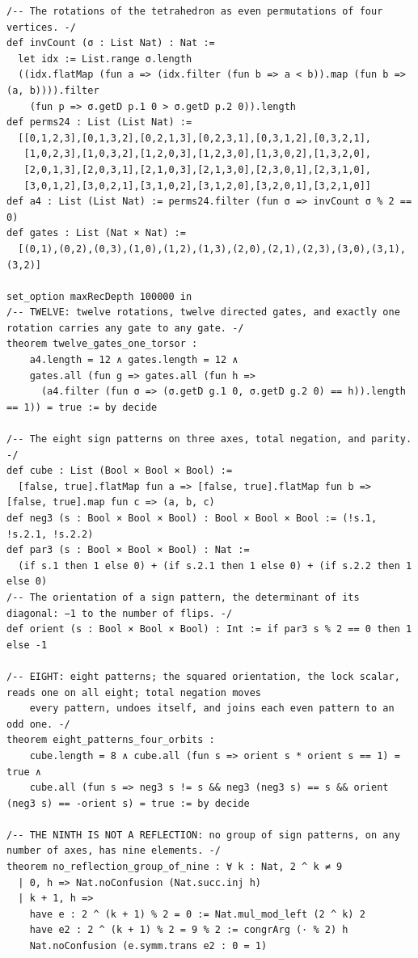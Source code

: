 \documentclass[10pt,twocolumn]{article}
\begin{document}
\begin{Verbatim}
/-- The rotations of the tetrahedron as even permutations of four vertices. -/
def invCount (σ : List Nat) : Nat :=
  let idx := List.range σ.length
  ((idx.flatMap (fun a => (idx.filter (fun b => a < b)).map (fun b => (a, b)))).filter
    (fun p => σ.getD p.1 0 > σ.getD p.2 0)).length
def perms24 : List (List Nat) :=
  [[0,1,2,3],[0,1,3,2],[0,2,1,3],[0,2,3,1],[0,3,1,2],[0,3,2,1],
   [1,0,2,3],[1,0,3,2],[1,2,0,3],[1,2,3,0],[1,3,0,2],[1,3,2,0],
   [2,0,1,3],[2,0,3,1],[2,1,0,3],[2,1,3,0],[2,3,0,1],[2,3,1,0],
   [3,0,1,2],[3,0,2,1],[3,1,0,2],[3,1,2,0],[3,2,0,1],[3,2,1,0]]
def a4 : List (List Nat) := perms24.filter (fun σ => invCount σ % 2 == 0)
def gates : List (Nat × Nat) :=
  [(0,1),(0,2),(0,3),(1,0),(1,2),(1,3),(2,0),(2,1),(2,3),(3,0),(3,1),(3,2)]

set_option maxRecDepth 100000 in
/-- TWELVE: twelve rotations, twelve directed gates, and exactly one rotation carries any gate to any gate. -/
theorem twelve_gates_one_torsor :
    a4.length = 12 ∧ gates.length = 12 ∧
    gates.all (fun g => gates.all (fun h =>
      (a4.filter (fun σ => (σ.getD g.1 0, σ.getD g.2 0) == h)).length == 1)) = true := by decide

/-- The eight sign patterns on three axes, total negation, and parity. -/
def cube : List (Bool × Bool × Bool) :=
  [false, true].flatMap fun a => [false, true].flatMap fun b => [false, true].map fun c => (a, b, c)
def neg3 (s : Bool × Bool × Bool) : Bool × Bool × Bool := (!s.1, !s.2.1, !s.2.2)
def par3 (s : Bool × Bool × Bool) : Nat :=
  (if s.1 then 1 else 0) + (if s.2.1 then 1 else 0) + (if s.2.2 then 1 else 0)
/-- The orientation of a sign pattern, the determinant of its diagonal: −1 to the number of flips. -/
def orient (s : Bool × Bool × Bool) : Int := if par3 s % 2 == 0 then 1 else -1

/-- EIGHT: eight patterns; the squared orientation, the lock scalar, reads one on all eight; total negation moves
    every pattern, undoes itself, and joins each even pattern to an odd one. -/
theorem eight_patterns_four_orbits :
    cube.length = 8 ∧ cube.all (fun s => orient s * orient s == 1) = true ∧
    cube.all (fun s => neg3 s != s && neg3 (neg3 s) == s && orient (neg3 s) == -orient s) = true := by decide

/-- THE NINTH IS NOT A REFLECTION: no group of sign patterns, on any number of axes, has nine elements. -/
theorem no_reflection_group_of_nine : ∀ k : Nat, 2 ^ k ≠ 9
  | 0, h => Nat.noConfusion (Nat.succ.inj h)
  | k + 1, h =>
    have e : 2 ^ (k + 1) % 2 = 0 := Nat.mul_mod_left (2 ^ k) 2
    have e2 : 2 ^ (k + 1) % 2 = 9 % 2 := congrArg (· % 2) h
    Nat.noConfusion (e.symm.trans e2 : 0 = 1)


\end{Verbatim}
\end{document}

